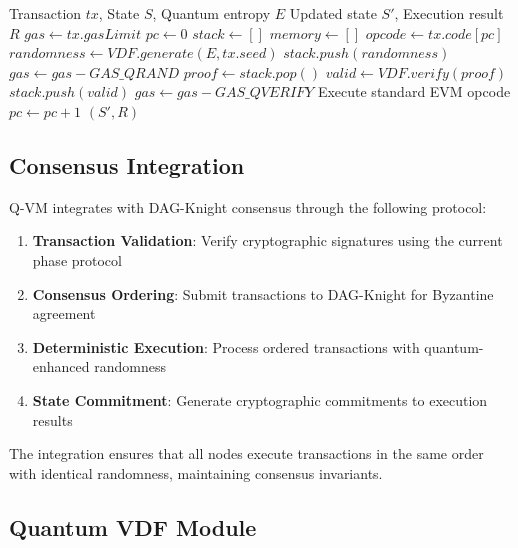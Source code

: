 \documentclass[11pt]{article}
\begin{document}
\begin{algorithm}
\caption{Q-VM Transaction Processing}
\begin{algorithmic}[1]
\REQUIRE Transaction $tx$, State $S$, Quantum entropy $E$
\ENSURE Updated state $S'$, Execution result $R$
\STATE $gas \leftarrow tx.gasLimit$
\STATE $pc \leftarrow 0$ 
\STATE $stack \leftarrow []$ 
\STATE $memory \leftarrow []$ 
    \STATE $opcode \leftarrow tx.code[pc]$
        \STATE $randomness \leftarrow VDF.generate(E, tx.seed)$
        \STATE $stack.push(randomness)$
        \STATE $gas \leftarrow gas - GAS\_QRAND$
        \STATE $proof \leftarrow stack.pop()$
        \STATE $valid \leftarrow VDF.verify(proof)$
        \STATE $stack.push(valid)$
        \STATE $gas \leftarrow gas - GAS\_QVERIFY$
    \ELSE
        \STATE Execute standard EVM opcode
    \ENDIF
    \STATE $pc \leftarrow pc + 1$
\ENDWHILE
\RETURN $(S', R)$
\end{algorithmic}
\end{algorithm}

\subsection{Consensus Integration}

Q-VM integrates with DAG-Knight consensus through the following protocol:

\begin{enumerate}
    \item \textbf{Transaction Validation}: Verify cryptographic signatures using the current phase protocol
    \item \textbf{Consensus Ordering}: Submit transactions to DAG-Knight for Byzantine agreement
    \item \textbf{Deterministic Execution}: Process ordered transactions with quantum-enhanced randomness
    \item \textbf{State Commitment}: Generate cryptographic commitments to execution results
\end{enumerate}

The integration ensures that all nodes execute transactions in the same order with identical randomness, maintaining consensus invariants.

\subsection{Quantum VDF Module}
\end{document}
